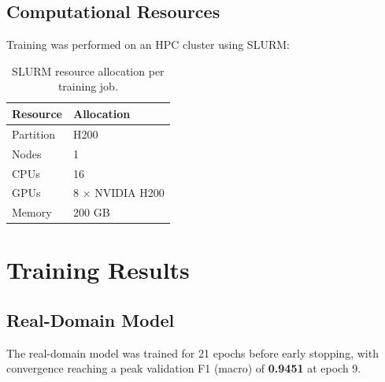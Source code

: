 \documentclass[12pt, a4paper]{article}
\begin{document}
\subsection{Computational Resources}

Training was performed on an HPC cluster using SLURM:

\begin{table}[H]
\centering
\caption{SLURM resource allocation per training job.}
\label{tab:slurm}
\begin{tabular}{ll}
\toprule
\textbf{Resource} & \textbf{Allocation} \\
\midrule
Partition & H200 \\
Nodes     & 1 \\
CPUs      & 16 \\
GPUs      & 8 $\times$ NVIDIA H200 \\
Memory    & 200 GB \\
\bottomrule
\end{tabular}
\end{table}


\section{Training Results}
\label{sec:training_results}

\subsection{Real-Domain Model}

The real-domain model was trained for 21 epochs before early stopping, with
convergence reaching a peak validation F1 (macro) of \textbf{0.9451} at epoch
9.
\end{document}
